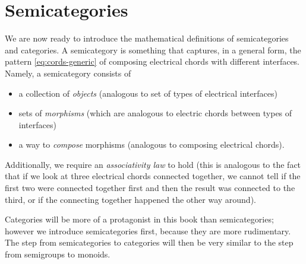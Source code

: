
\section[Semicategories]{Semicategories}
\label{sec:formal-def-semicat}



We are now ready to introduce the mathematical definitions of semicategories and categories.
A semicategory is something that captures, in a general form, the pattern \cref{eq:cords-generic} of composing electrical chords with different interfaces.
Namely, a semicategory consists of
\begin{itemize}
    \item a collection of \emph{objects} (analogous to set of types of electrical interfaces)
    \item sets of \emph{morphisms} (which are analogous to electric chords between types of interfaces)
    \item a way to \emph{compose} morphisms (analogous to composing electrical chords).
\end{itemize}
Additionally, we require an \emph{associativity law} to hold (this is analogous to the fact that if we look at three electrical chords connected together, we cannot tell if the first two were connected together first and then the result was connected to the third, or if the connecting together happened the other way around).

Categories will be more of a protagonist in this book than semicategories; however we introduce semicategories first, because they are more rudimentary.
The step from semicategories to categories will then be very similar to the step from semigroups to monoids.

